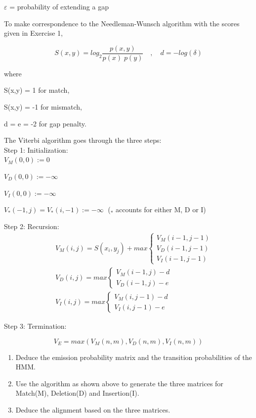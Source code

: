 \documentclass[a4paper,11pt]{article}
\begin{document}
$\varepsilon$ = probability of extending a gap

\vspace{0.5cm}

To make correspondence to the Needleman-Wunsch algorithm with the scores given in Exercise 1,


$$S(x,y)=log_2\frac{p(x,y)}{p(x)\; p(y)} \quad , \quad d=-log(\delta)$$


where 

S(x,y) = 1 for match, 

S(x,y) = -1 for mismatch,

d = e = -2 for gap penalty.

\newpage
The Viterbi algorithm goes through the three steps:\\


Step 1: Initialization:\\

$V_M(0,0):=0$

$V_D(0,0):=-\infty$

$V_I(0,0):=-\infty$

$V_*(-1,j)=V_*(i,-1):=-\infty \;$ ($_*$ accounts for either M, D or I)
\vspace{0.5cm}

Step 2: Recursion:
\begin{eqnarray}
&&
V_M(i,j) =S(x_{i},y_{j})+max 
	\left\{ \begin{array}{l}
	 V_M(i-1,j-1) \\
     V_D(i-1,j-1) \\
     V_I(i-1,j-1)
    \end{array} \right.\nonumber\\
&&
V_D(i,j) =max \left\{ 
    \begin{array}{ll}
     V_M(i-1,j)-d \\
     V_D(i-1,j)-e 
    \end{array} \right.\nonumber\\
&&
V_I(i,j) =max \left\{ 
    \begin{array}{ll}
     V_M(i,j-1)-d\\
     V_I(i,j-1)-e
    \end{array} \right.\nonumber
\end{eqnarray}


Step 3: Termination:

$$V_E=max(V_M(n,m),V_D(n,m),V_I(n,m))$$


\begin{enumerate}
\item Deduce the emission probability matrix and the transition probabilities of the HMM.
\item Use the algorithm as shown above to generate the three matrices for Match(M), Deletion(D) and Insertion(I).
\item Deduce the alignment based on the three matrices.
\end{enumerate}
\end{document}
